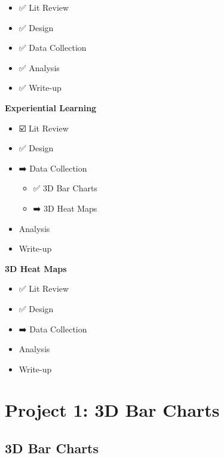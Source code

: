 \documentclass[phd]{nuthesis}
\begin{document}
\begin{itemize}
\tightlist
\item
  ✅ Lit Review
\item
  ✅ Design
\item
  ✅ Data Collection
\item
  ✅ Analysis
\item
  ✅ Write-up
\end{itemize}

\textbf{Experiential Learning}

\begin{itemize}
\tightlist
\item
  ☑️ Lit Review
\item
  ✅ Design
\item
  ➡️ Data Collection

  \begin{itemize}
  \tightlist
  \item
    ✅ 3D Bar Charts
  \item
    ➡️ 3D Heat Maps
  \end{itemize}
\item
  Analysis
\item
  Write-up
\end{itemize}

\textbf{3D Heat Maps}

\begin{itemize}
\tightlist
\item
  ✅ Lit Review
\item
  ✅ Design
\item
  ➡️ Data Collection
\item
  Analysis
\item
  Write-up
\end{itemize}

\section{Project 1: 3D Bar Charts}\label{project-1-3d-bar-charts}

\subsection{3D Bar Charts}\label{d-bar-charts}
\end{document}
